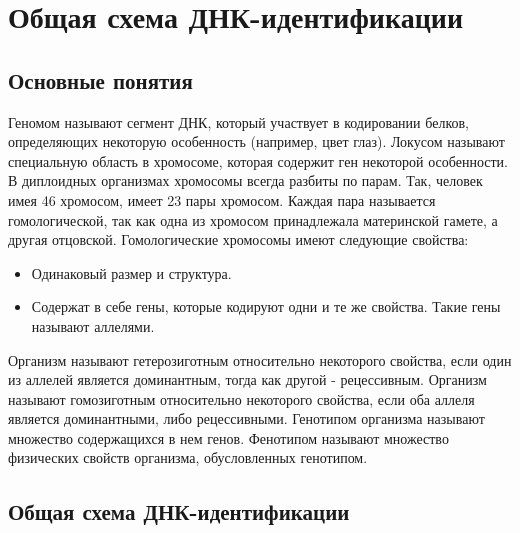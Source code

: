 \chapter{Общая схема ДНК-идентификации}

\section{Основные понятия}





Геномом называют сегмент ДНК, который участвует в кодировании белков, определяющих
некоторую особенность (например, цвет глаз). Локусом называют специальную область в хромосоме,
которая содержит ген некоторой особенности. В диплоидных организмах хромосомы всегда
разбиты по парам. Так, человек имея 46 хромосом, имеет 23 пары хромосом.
Каждая пара называется гомологической, так как одна из хромосом принадлежала материнской гамете, а другая отцовской.
Гомологические хромосомы имеют следующие свойства:
\begin{itemize}
\item Одинаковый размер и структура.
\item Содержат в себе гены, которые кодируют одни и те же свойства. Такие гены называют аллелями.
\end{itemize}
Организм называют гетерозиготным относительно некоторого свойства, если один из аллелей является доминантным,
тогда как другой - рецессивным.
Организм называют гомозиготным относительно некоторого свойства, если оба аллеля является доминантными,
либо рецессивными.
Генотипом организма называют множество содержащихся в нем генов.
Фенотипом называют множество физических свойств организма, обусловленных генотипом.




\section{Общая схема ДНК-идентификации}

